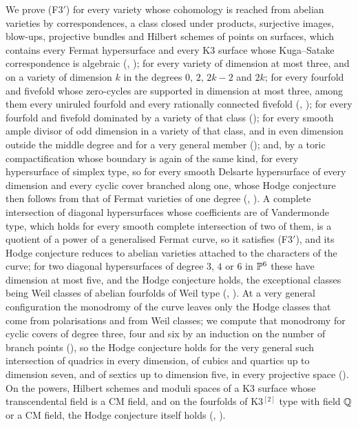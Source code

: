 We prove (F3$'$) for every variety whose cohomology is reached from abelian
varieties by correspondences, a class closed under products, surjective
images, blow-ups, projective bundles and Hilbert schemes of points on
surfaces, which contains every Fermat hypersurface and every K3 surface whose
Kuga--Satake correspondence is algebraic (,
); for every variety of dimension at most three, and on
a variety of dimension $k$ in the degrees $0$, $2$, $2k-2$ and $2k$; for
every fourfold and fivefold whose zero-cycles are supported in dimension at
most three, among them every uniruled fourfold and every rationally connected
fivefold (, ); for every
fourfold and fivefold dominated by a variety of that class
(); for every smooth ample divisor of odd
dimension in a variety of that class, and in even dimension outside the
middle degree and for a very general member ();
and, by a toric compactification whose boundary is again of the same kind, for
every hypersurface of simplex type, so for every smooth Delsarte hypersurface
of every dimension and every cyclic cover branched along one, whose Hodge
conjecture then follows from that of Fermat varieties of one degree
(, ). A complete intersection
of diagonal hypersurfaces whose coefficients are of Vandermonde type, which
holds for every smooth complete intersection of two of them, is a quotient
of a power of a generalised Fermat curve, so it satisfies (F3$'$), and its
Hodge conjecture reduces to abelian varieties attached to the characters of
the curve; for two diagonal hypersurfaces of degree $3$, $4$ or $6$ in
$\mathbb{P}^{6}$ these have dimension at most five, and the Hodge conjecture holds,
the exceptional classes being Weil classes of abelian fourfolds of Weil type
(, ). At a very general
configuration the monodromy of the curve leaves only the Hodge classes that
come from polarisations and from Weil classes; we compute that monodromy for
cyclic covers of degree three, four and six by an induction on the number of
branch points (), so the Hodge conjecture holds
for the very general such intersection of quadrics in every dimension, of
cubics and quartics up to dimension seven, and of sextics up to dimension
five, in every projective space (). On the powers, Hilbert
schemes and moduli spaces of a K3 surface whose transcendental field is a CM
field, and on the fourfolds of K3$^{[2]}$ type with field $\mathbb{Q}$ or a CM
field, the Hodge conjecture itself holds (,
).

